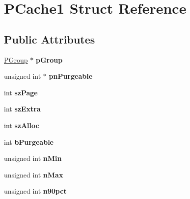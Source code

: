 \hypertarget{struct_p_cache1}{}\section{P\+Cache1 Struct Reference}
\label{struct_p_cache1}
\subsection*{Public Attributes}
\begin{DoxyCompactItemize}
\item 
\mbox{\label{struct_p_cache1_ae3389f0c68d6946a1eebeeee835ece69}} 
\mbox{\hyperlink{struct_p_group}{P\+Group}} $\ast$ {\bfseries p\+Group}
\item 
\mbox{\label{struct_p_cache1_aa9e211d2615e2be9c4db1531891c9ff1}} 
unsigned int $\ast$ {\bfseries pn\+Purgeable}
\item 
\mbox{\label{struct_p_cache1_a1425039a858b7518c097d8ae92597de0}} 
int {\bfseries sz\+Page}
\item 
\mbox{\label{struct_p_cache1_a1e96e6671732e0af641732991b681ede}} 
int {\bfseries sz\+Extra}
\item 
\mbox{\label{struct_p_cache1_aa40b14da40f3c940978af20e99500000}} 
int {\bfseries sz\+Alloc}
\item 
\mbox{\label{struct_p_cache1_a2af7d24e27369252addec9bef45afcfc}} 
int {\bfseries b\+Purgeable}
\item 
\mbox{\label{struct_p_cache1_a9e96c79ec60c2e368f92a2ba52d01c44}} 
unsigned int {\bfseries n\+Min}
\item 
\mbox{\label{struct_p_cache1_aef08139a0b86b0c0a7ee2bec0bab2405}} 
unsigned int {\bfseries n\+Max}
\item 
\mbox{\label{struct_p_cache1_a8a5c5ab7d71e66c2a4df3f22513888f0}} 
unsigned int {\bfseries n90pct}
\item 
\mbox{\label{struct_p_cache1_a2dff616ad2d1873ad3a8d20d53bcb4d0}} 

\end{DoxyCompactItemize}
